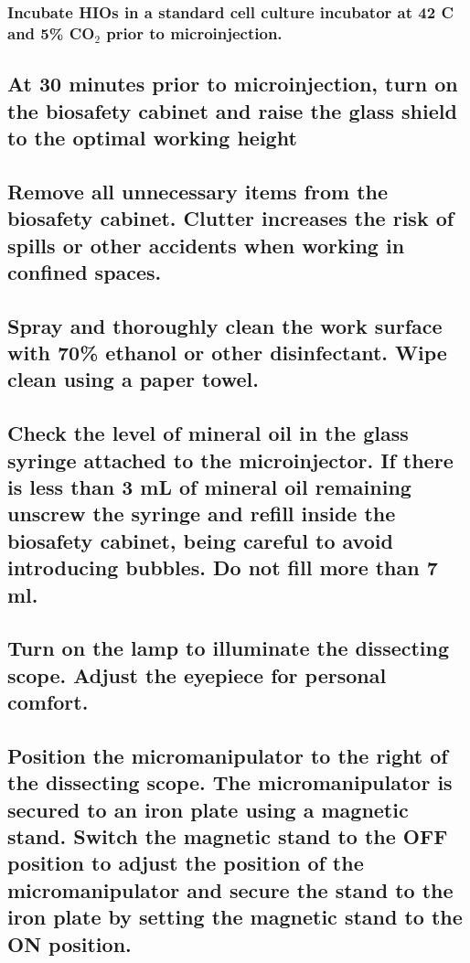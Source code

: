 \documentclass[11pt]{article}
\begin{document}
\subsubsection{{\sffamily } Incubate HIOs in a standard cell culture incubator at 42 \textdegree{}C and 5\% CO\(_{\text{2}}\) prior to microinjection.}
\label{sec:orgheadline13}
\subsection{{\sffamily } At 30 minutes prior to microinjection, turn on the biosafety cabinet and raise the glass shield to the optimal working height}
\label{sec:orgheadline15}
\subsection{{\sffamily } Remove all unnecessary items from the biosafety cabinet. Clutter increases the risk of spills or other accidents when working in confined spaces.}
\label{sec:orgheadline16}
\subsection{{\sffamily } Spray and thoroughly clean the work surface with 70\% ethanol or other disinfectant. Wipe clean using a paper towel.}
\label{sec:orgheadline17}
\subsection{{\sffamily } Check the level of mineral oil in the glass syringe attached to the microinjector. If there is less than 3 mL of mineral oil remaining unscrew the syringe and refill inside the biosafety cabinet, being careful to avoid introducing bubbles. Do not fill more than 7 ml.}
\label{sec:orgheadline18}
\subsection{{\sffamily } Turn on the lamp to illuminate the dissecting scope. Adjust the eyepiece for personal comfort.}
\label{sec:orgheadline19}
\subsection{{\sffamily } Position the micromanipulator to the right of the dissecting scope. The micromanipulator is secured to an iron plate using a magnetic stand. Switch the magnetic stand to the OFF position to adjust the position of the micromanipulator and secure the stand to the iron plate by setting the magnetic stand to the ON position.}
\label{sec:orgheadline20}
\end{document}
